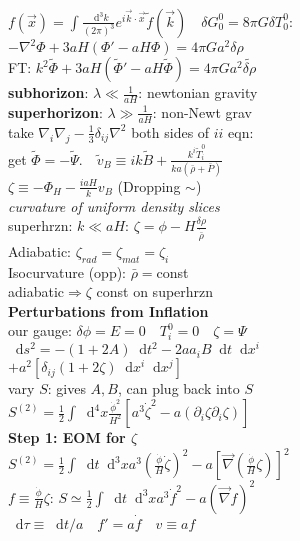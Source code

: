 \documentclass[12pt]{article}
\newcommand*\diff{\mathop{}\!\mathrm{d}}
\begin{document}
{	\\$f(\vec{x})=\int\frac{\diff^3k}{(2\pi)^3}e^{i\vec{k}\cdot\vec{x}}\tilde{f}(\vec{k}) \quad \delta G_0^0=8\pi G \delta T_0^0:$
	\\$-\nabla^2\Phi+3aH(\Phi'-aH\Phi)=4\pi Ga^2\delta\rho$
	\\FT: $k^2\tilde{\Phi}+3aH(\tilde{\Phi}'-aH\tilde{\Phi})=4\pi G a^2\tilde{\delta\rho}$
	\\\textbf{subhorizon}: $\lambda \ll \frac{1}{aH}$: newtonian gravity
	\\\textbf{superhorizon}: $\lambda \gg \frac{1}{aH}$: non-Newt grav
	\\take $\nabla_i\nabla_j-\frac{1}{3}\delta_{ij}\nabla^2$ both sides of $ii$ eqn:
	\\get $\tilde{\Phi}=-\tilde{\Psi}. \quad \tilde{v}_B\equiv ik\tilde{B}+\frac{k^i\tilde{T}_i^0}{ka(\bar{\rho}+\bar{P})}$
	\\$\zeta\equiv-\Phi_H-\frac{iaH}{k}v_B$ (Dropping $\sim$)
	\\\textit{curvature of uniform density slices}
	\\superhrzn: $k \ll aH$: $\zeta = \phi -H\frac{\delta\rho}{\dot{\bar{\rho}}}$
	\\Adiabatic:  $\zeta_{rad}=\zeta_{mat}=\zeta_i$
	\\Isocurvature (opp): $\bar{\rho}=$const
	\\adiabatic$\Rightarrow \zeta$ const on superhrzn
	\\\textbf{Perturbations from Inflation}
	\\our gauge: $\delta\phi=E=0 \quad T_i^0=0 \quad \zeta=\Psi$
	\\$\diff s^2=-(1+2A)\diff t^2 - 2aa_iB\diff t\diff x^i$
	\\$+ a^2\left[\delta_{ij}(1+2\zeta)\diff x^i\diff x^j\right]$
	\\vary $S$: gives $A, B$, can plug back into $S$
	\\$S^{(2)}=\frac{1}{2}\int\diff^4x\frac{\dot{\phi}^2}{H^2}\left[a^3\dot{\zeta}^2-a(\partial_i\zeta\partial_i\zeta)\right]$
	\\\textbf{Step 1: EOM for $\zeta$}
	\\$S^{(2)}=\frac{1}{2}\int\diff t\diff^3xa^3\left(\frac{\dot{\phi}}{H}\dot{\zeta}\right)^2-a\left[\vec{\nabla}\left(\frac{\dot{\phi}}{H}\zeta\right)\right]^2$
	\\$f\equiv\frac{\dot{\phi}}{H}\zeta$: $S\simeq \frac{1}{2}\int\diff t\diff^3xa^3\dot{f}^2-a(\vec{\nabla}f)^2$
	\\$\diff\tau\equiv\diff t/a \quad f'=a\dot{f} \quad v\equiv af$
}
\end{document}
